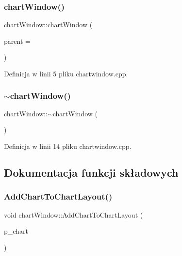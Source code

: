 \subsubsection{\texorpdfstring{chart\+Window()}{chartWindow()}}
{\footnotesize\ttfamily chart\+Window\+::chart\+Window (\begin{DoxyParamCaption}\item[{Q\+Widget $\ast$}]{parent = {} }\end{DoxyParamCaption})\hspace{0.3cm}{\ttfamily [explicit]}}



Definicja w linii 5 pliku chartwindow.\+cpp.

\mbox{\label{classchart_window_a83ab3ef7c1682d56593464d3949ca00a}} 
\subsubsection{\texorpdfstring{$\sim$chart\+Window()}{~chartWindow()}}
{\footnotesize\ttfamily chart\+Window\+::$\sim$chart\+Window (\begin{DoxyParamCaption}{ }\end{DoxyParamCaption})}



Definicja w linii 14 pliku chartwindow.\+cpp.



\subsection{Dokumentacja funkcji składowych}
\mbox{\label{classchart_window_aea050d10a2c8706e3ff0e468344380b0}} 
\subsubsection{\texorpdfstring{Add\+Chart\+To\+Chart\+Layout()}{AddChartToChartLayout()}}
{\footnotesize\ttfamily void chart\+Window\+::\+Add\+Chart\+To\+Chart\+Layout (\begin{DoxyParamCaption}\item[{Q\+Chart $\ast$}]{p\+\_\+chart }\end{DoxyParamCaption})}




